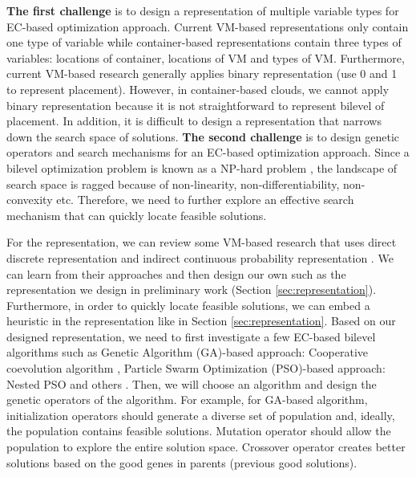 \begin{enumerate}
	 \textbf{The first challenge} is to design a representation of multiple variable types for EC-based optimization approach. Current VM-based representations only contain one type of variable while container-based representations contain three types of variables: locations of container, locations of VM and types of VM. Furthermore, current VM-based research generally applies binary representation (use 0 and 1 to represent placement). However, in container-based clouds, we cannot apply binary representation because it is not straightforward to represent bilevel of placement. 
	In addition, it is difficult to design a representation that narrows down the search space of solutions.  \textbf{The second challenge} is to design genetic operators and search mechanisms for an EC-based optimization approach. Since a bilevel optimization problem is known as a NP-hard problem \cite{Mathieu:2011dw}, the landscape of search space is ragged because of non-linearity, non-differentiability, non-convexity etc. Therefore, we need to further explore an effective search mechanism that can quickly locate feasible solutions.

	 For the representation, we can review some VM-based research that uses direct discrete representation \cite{Xu:2010vh} and indirect continuous probability representation \cite{Xiong:2014jq}. We can learn from their approaches and then design our own such as the representation we design in preliminary work (Section \ref{sec:representation}). Furthermore, in order to quickly locate feasible solutions, we can embed a heuristic in the representation like in Section \ref{sec:representation}. 
	Based on our designed representation, we need to first investigate a few EC-based bilevel algorithms such as Genetic Algorithm (GA)-based approach: Cooperative coevolution algorithm \cite{Legillon:2012dd}, Particle Swarm Optimization (PSO)-based approach: Nested PSO \cite{Li:2006br} and others \cite{Angelo:2013ee, Zhu:2006in}. Then, we will choose an algorithm and design the genetic operators of the algorithm. For example, for GA-based algorithm, initialization operators should generate a diverse set of population and, ideally, the population contains feasible solutions. Mutation operator should allow the population to explore the entire solution space. Crossover operator creates better solutions based on the good genes in parents (previous good solutions).
	


\end{enumerate}
